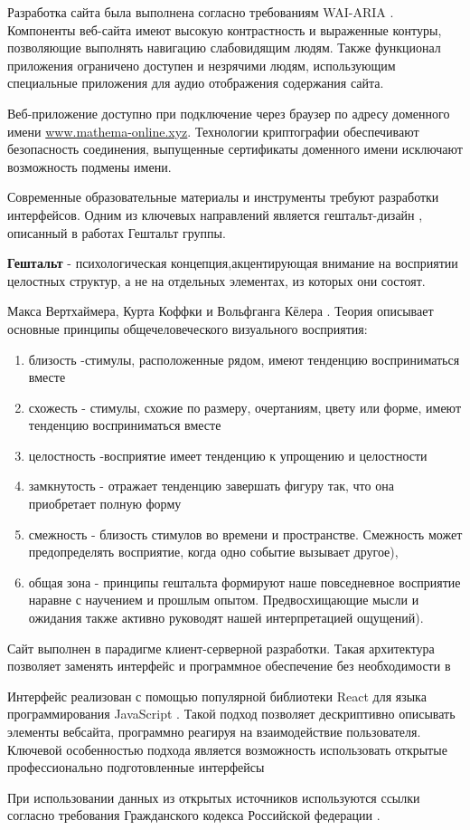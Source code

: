 Разработка сайта была выполнена согласно требованиям WAI-ARIA \cite{craig2009accessible}.
Компоненты веб-сайта имеют высокую контрастность и выраженные контуры, позволяющие выполнять навигацию слабовидящим людям. 
Также функционал приложения ограничено доступен и незрячими людям, использующим специальные приложения для аудио отображения
содержания сайта.

Веб-приложение доступно при подключение через браузер по адресу доменного имени \url{www.mathema-online.xyz}. 
Технологии криптографии обеспечивают безопасность соединения, выпущенные сертификаты доменного имени 
исключают возможность подмены имени.

Современные образовательные материалы и инструменты требуют разработки интерфейсов. 
Одним из ключевых направлений является гештальт-дизайн \cite{wertheimer1938laws}, описанный в работах Гештальт группы.

 \textbf{Гештальт} - психологическая концепция,акцентирующая внимание на восприятии целостных структур, а не на отдельных элементах, из которых они состоят.

Макса Вертхаймера, Курта Коффки и Вольфганга Кёлера . Теория описывает основные принципы общечеловеческого визуального восприятия: 
\begin{enumerate}
    \item близость -стимулы, расположенные рядом, имеют тенденцию восприниматься вместе
    \item схожесть - стимулы, схожие по размеру, очертаниям, цвету или форме, имеют тенденцию восприниматься вместе
    \item целостность -восприятие имеет тенденцию к упрощению и целостности
    \item замкнутость - отражает тенденцию завершать фигуру так, что она приобретает полную форму
    \item смежность - близость стимулов во времени и пространстве. Смежность может предопределять восприятие, когда одно событие вызывает другое),
    \item общая зона - принципы гештальта формируют наше повседневное восприятие наравне с научением и прошлым опытом. Предвосхищающие мысли и ожидания также активно руководят нашей интерпретацией ощущений).
\end{enumerate}


Сайт выполнен в парадигме клиент-серверной разработки. Такая архитектура
позволяет заменять интерфейс и программное обеспечение без необходимости в 

Интерфейс реализован с помощью популярной библиотеки React для языка программирования JavaScript \cite{ackenheimer2015introduction}.
Такой подход позволяет дескриптивно описывать элементы вебсайта, программно реагируя на взаимодействие пользователя. 
Ключевой особенностью подхода является возможность использовать открытые профессионально подготовленные интерфейсы 

При использовании данных из открытых источников используются ссылки согласно требования Гражданского кодекса
Российской федерации \cite{law1274} \cite{law1260}.
